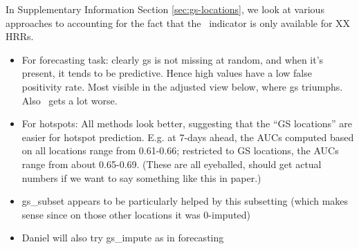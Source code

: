 \documentclass[9pt,twocolumn,twoside,lineno]{pnas-new}
\begin{document}
In Supplementary Information Section \ref{sec:gs-locations}, we look at various approaches to
accounting for the fact that the \gs~indicator is only available
for XX HRRs.

\begin{itemize}
  \item For forecasting task: clearly gs is not missing at random, and when it's present, it tends to be predictive.  Hence high values have a low false positivity rate.  Most visible in the adjusted view below, where gs triumphs.  Also \chngcli~gets a lot worse.

\item For hotspots: All methods look better, suggesting that the “GS locations” are easier for hotspot prediction. E.g. at 7-days ahead, the AUCs computed based on all locations range from 0.61-0.66; restricted to GS locations, the AUCs range from about 0.65-0.69. (These are all eyeballed, should get actual numbers if we want to say something like this in paper.)
\item gs\_subset appears to be particularly helped by this subsetting
  (which makes sense since on those other locations it was 0-imputed)
  \item Daniel will also try gs\_impute as in forecasting
\end{itemize}

\end{document}
